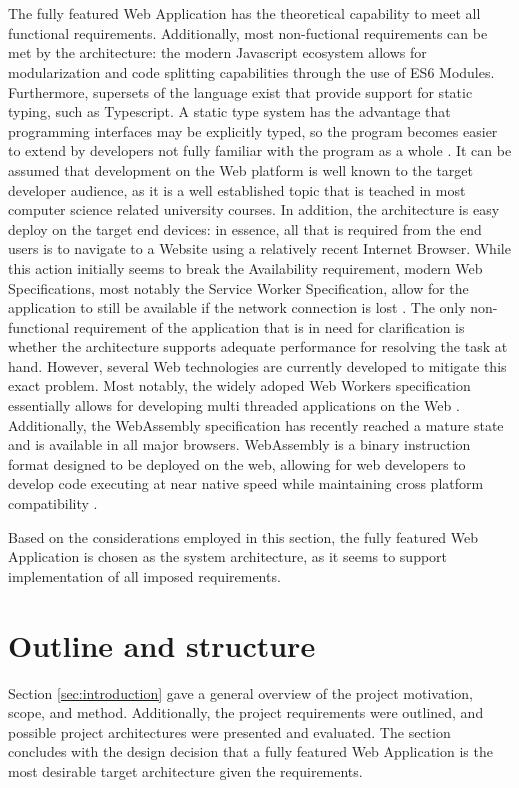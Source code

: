 \\\\
The fully featured Web Application has the theoretical capability to meet all functional requirements. Additionally, most non-fuctional requirements can be met by the architecture: the modern Javascript ecosystem allows for modularization and code splitting capabilities through the use of ES6 Modules. Furthermore, supersets of the language exist that provide support for static typing, such as Typescript. A static type system has the advantage that programming interfaces may be explicitly typed, so the program becomes easier to extend by developers not fully familiar with the program as a whole \cite{TypescriptUnderstanding}. It can be assumed that development on the Web platform is well known to the target developer audience, as it is a well established topic that is teached in most computer science related university courses. In addition, the architecture is easy deploy on the target end devices: in essence, all that is required from the end users is to navigate to a Website using a relatively recent Internet Browser. While this action initially seems to break the Availability requirement, modern Web Specifications, most notably the Service Worker Specification, allow for the application to still be available if the network connection is lost \cite{serviceworkersdraft}. The only non-functional requirement of the application that is in need for clarification is whether the architecture supports adequate performance for resolving the task at hand. However, several Web technologies are currently developed to mitigate this exact problem. Most notably, the widely adoped Web Workers specification essentially allows for developing multi threaded applications on the Web \cite{workerdraft}. Additionally, the WebAssembly specification has recently reached a mature state and is available in all major browsers. WebAssembly is a binary instruction format designed to be deployed on the web, allowing for web developers to develop code executing at near native speed while maintaining cross platform compatibility \cite{wasmdraft}.

Based on the considerations employed in this section, the fully featured Web Application is chosen as the system architecture, as it seems to support implementation of all imposed requirements.

\section{Outline and structure}
Section \ref{sec:introduction} gave a general overview of the project motivation, scope, and method. Additionally, the project requirements were outlined, and possible project architectures were presented and evaluated. The section concludes with the design decision that a fully featured Web Application is the most desirable target architecture given the requirements.


